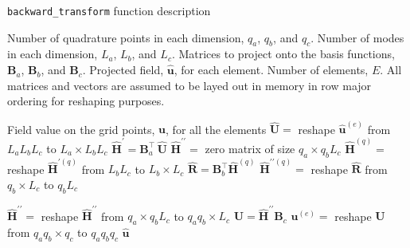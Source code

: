 \documentclass{ccr16}
\begin{document}
{{{                \renewcommand{\algorithmicrequire}{\textbf{Input:}}
                \renewcommand{\algorithmicensure}{\textbf{Output:}}

                \begin{algorithm}[t]
                    \caption{\texttt{backward\_transform} function description}

                    \begin{algorithmic}[1]
                        \Require Number of quadrature points in each dimension, $q_{a}$, $q_{b}$, and $q_{c}$. Number of modes in each dimension, $L_{a}$, $L_{b}$, and $L_{c}$. Matrices to project onto the basis functions, $\boldsymbol{B}_{a}$, $\boldsymbol{B}_{b}$, and $\boldsymbol{B}_{c}$. Projected field, $\hat{\boldsymbol{u}}$, for each element. Number of elements, $E$. All matrices and vectors are assumed to be layed out in memory in row major ordering for reshaping purposes.

                        \Ensure Field value on the grid points, $\boldsymbol{u}$, for all the elements
                                \State $\hat{\boldsymbol{U}} = $ reshape $\hat{\boldsymbol{u}}^{\left ( e \right )}$ from $L_{a} L_{b} L_{c}$ to $L_{a} \times L_{b} L_{c}$
                                \State $\hat{\boldsymbol{H}}^{\prime} = \boldsymbol{B}_{a}^{\top} \, \hat{\boldsymbol{U}}$
                                \State $\hat{\boldsymbol{H}}^{\prime \prime} = $ zero matrix of size $q_{a} \times q_{b} L_{c}$
                                    \State $\hat{\boldsymbol{H}}^{\left ( q \right )} = $ reshape $\hat{\boldsymbol{H}}^{\prime \left ( q \right )}$ from $L_{b} L_{c}$ to $L_{b} \times L_{c}$
                                    \State $\hat{\boldsymbol{R}} = \boldsymbol{B}_{b}^{\top} \hat{\boldsymbol{H}}^{\left ( q \right )}$
                                    \State $\hat{\boldsymbol{H}}^{\prime \prime \left ( q \right )} = $ reshape $\hat{\boldsymbol{R}}$ from $q_{b} \times L_{c}$ to $q_{b} L_{c}$
                                \EndFor

                                \State $\hat{\boldsymbol{H}}^{\prime \prime} = $ reshape $\hat{\boldsymbol{H}}^{\prime \prime}$ from $q_{a} \times q_{b} L_{c}$ to $q_{a} q_{b} \times L_{c}$
                                \State $\boldsymbol{U} = \hat{\boldsymbol{H}}^{\prime \prime} \boldsymbol{B}_{c}$
                                \State $\boldsymbol{u}^{\left ( e \right )} = $ reshape $\boldsymbol{U}$ from $q_{a} q_{b} \times q_{c}$ to $q_{a} q_{b} q_{c}$
                            \EndFor
                            \State \Return $\hat{\boldsymbol{u}}$
                        \EndProcedure
                    \end{algorithmic}
                    \label{PDBM:alg:backward_transform}
                \end{algorithm}
            }
        }

}
\end{document}
